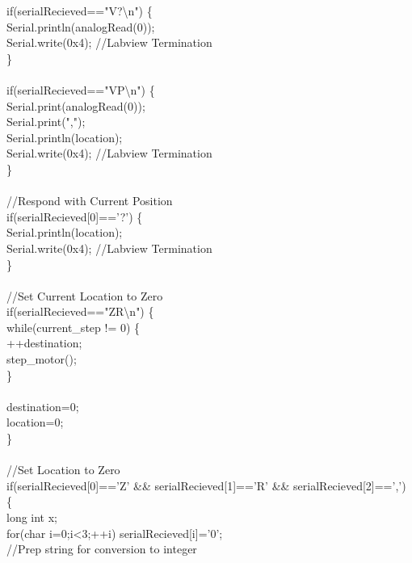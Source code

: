 {{\tabto*{.5cm}	if(serialRecieved=="V?\textbackslash n") \{\\
\tabto*{1cm}		Serial.println(analogRead(0));\\
\tabto*{1cm}		Serial.write(0x4);\tabto*{7.5cm}  //Labview Termination\\
\tabto*{.5cm}	\}\\
\\	
\tabto*{.5cm}	if(serialRecieved=="VP\textbackslash n") \{\\
\tabto*{1cm}		Serial.print(analogRead(0)); \\
\tabto*{1cm}		Serial.print(","); \\
\tabto*{1cm}		Serial.println(location); \\
\tabto*{1cm}		Serial.write(0x4);\tabto*{7.5cm} //Labview Termination\\
\tabto*{.5cm}	\} \\
\\	
\tabto*{.5cm}	//Respond with Current Position\\
\tabto*{.5cm}	if(serialRecieved[0]=='?') \{\\
\tabto*{1cm}		Serial.println(location);\\
\tabto*{1cm}		Serial.write(0x4); \tabto*{7.5cm} //Labview Termination\\
\tabto*{.5cm}	\}\\
\\	
\tabto*{.5cm}	//Set Current Location to Zero\\
\tabto*{.5cm}	if(serialRecieved=="ZR\textbackslash n") \{\\
\tabto*{1cm}		while(current\_step != 0) \{\\
\tabto*{1.5cm}			++destination;\\
\tabto*{1.5cm}			step\_motor();\\
\tabto*{1cm}		\}\\
\\		
\tabto*{1cm}		destination=0;\\
\tabto*{1cm}		location=0;\\
\tabto*{.5cm}	\}\\
\\	
\tabto*{.5cm}	//Set Location to Zero\\
\tabto*{.5cm}	if(serialRecieved[0]=='Z' \&\& serialRecieved[1]=='R' \&\& serialRecieved[2]==',') \{\\
\tabto*{1cm}		long int x;\\
\tabto*{1cm}		for(char i=0;i<3;++i) serialRecieved[i]='0';\tabto*{7.5cm}\\ \tabto*{1cm}//Prep string for conversion to integer\\
}}
